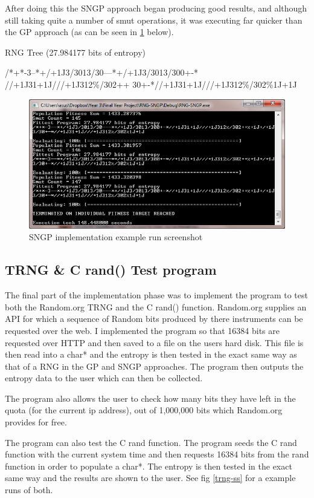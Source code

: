 \documentclass[a4paper,10.5pt]{article}
\begin{document}
After doing this the SNGP approach began producing good results, and although still taking quite a number of smut operations, it was executing far quicker than the GP approach (as can be seen in \ref{sngp-ss} below).

\begin{center}
RNG Tree (27.984177 bits of entropy) 

/*+*-3--*+/+1J3/3013/30---*+/+1J3/3013/300+-* 
//+1J31+1J///+1J312\%/302++%
30+-*//+1J31+1J///+1J312\%/302\%1J+1J 
\end{center}

\begin{figure}[!h]
\centering
\includegraphics[width=120mm]{sngp-ss.png}
\caption{SNGP implementation example run screenshot}
\label{sngp-ss}
\end{figure}

\subsection{TRNG \& C rand() Test program}
The final part of the implementation phase was to implement the program to test both the Random.org TRNG and the C rand() function. Random.org supplies an API for which a sequence of Random bits produced by there instruments can be requested over the web. I implemented the program so that 16384 bits are requested over HTTP and then saved to a file on the users hard disk. This file is then read into a char* and the entropy is then tested in the exact same way as that of a RNG in the GP and SNGP approaches. The program then outputs the entropy data to the user which can then be collected.

The program also allows the user to check how many bits they have left in the quota (for the current ip address), out of 1,000,000 bits which Random.org provides for free.

The program can also test the C rand function. The program seeds the C rand function with the current system time and then requests 16384 bits from the rand function in order to populate a char*. The entropy is then tested in the exact same way and the results are shown to the user. See fig \ref{trng-ss} for a example runs of both.
\end{document}

